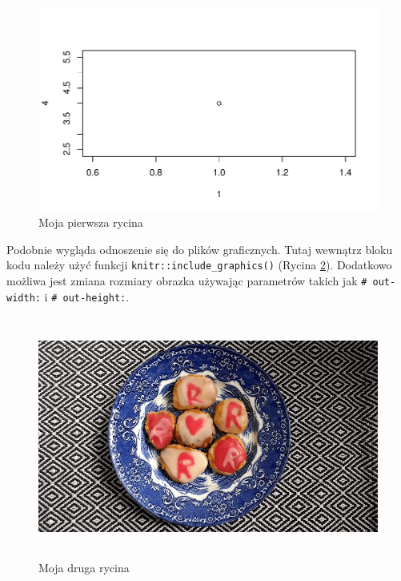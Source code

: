 \documentclass{amuthesis}
\begin{document}
\begin{figure}[t]

{\centering \includegraphics{./03-roz3_files/figure-pdf/fig-rycina1-1.pdf}

}

\caption{\label{fig-rycina1}Moja pierwsza rycina}

\end{figure}

Podobnie wygląda odnoszenie się do plików graficznych. Tutaj wewnątrz
bloku kodu należy użyć funkcji \texttt{knitr::include\_graphics()}
(Rycina \ref{fig-rycina2}). Dodatkowo możliwa jest zmiana rozmiary
obrazka używając parametrów takich jak \texttt{\#\textbar{}\ out-width:}
i \texttt{\#\textbar{}\ out-height:}.

\begin{figure}[t]

{\centering \includegraphics[width=1\textwidth,height=3.125in]{./figures/rcookies.png}

}

\caption{\label{fig-rycina2}Moja druga rycina}

\end{figure}
\end{document}
